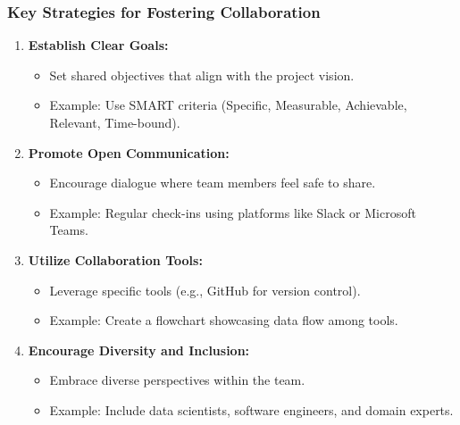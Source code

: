 \documentclass[aspectratio=169]{beamer}
\begin{document}
\begin{frame}[fragile]
    \frametitle{Key Strategies for Fostering Collaboration}
    \begin{enumerate}
        \item \textbf{Establish Clear Goals:}
            \begin{itemize}
                \item Set shared objectives that align with the project vision.
                \item Example: Use SMART criteria (Specific, Measurable, Achievable, Relevant, Time-bound).
            \end{itemize}
        \item \textbf{Promote Open Communication:}
            \begin{itemize}
                \item Encourage dialogue where team members feel safe to share.
                \item Example: Regular check-ins using platforms like Slack or Microsoft Teams.
            \end{itemize}
        \item \textbf{Utilize Collaboration Tools:}
            \begin{itemize}
                \item Leverage specific tools (e.g., GitHub for version control).
                \item Example: Create a flowchart showcasing data flow among tools.
            \end{itemize}
        \item \textbf{Encourage Diversity and Inclusion:}
            \begin{itemize}
                \item Embrace diverse perspectives within the team.
                \item Example: Include data scientists, software engineers, and domain experts.
            \end{itemize}
    \end{enumerate}
\end{frame}
\end{document}
